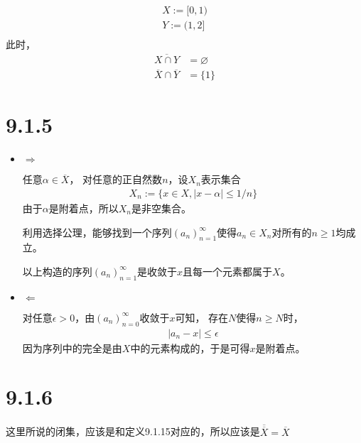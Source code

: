\documentclass{article}
\begin{document}
\begin{align*}
      X := [0, 1) \\
      Y := (1, 2] \\
\end{align*}
此时，
\begin{align*}
      \overline{X \cap Y}            & = \varnothing \\
      \overline{X} \cap \overline{Y} & = \{1\}
\end{align*}

\section*{9.1.5}

\begin{itemize}
      \item $\Rightarrow$

            任意$\alpha \in \overline{X}$，
            对任意的正自然数$n$，设$X_n$表示集合
            \begin{align*}
                  X_n := \{ x \in X, |x - \alpha| \leq 1/n \}
            \end{align*}
            由于$\alpha$是附着点，所以$X_n$是非空集合。

            利用选择公理，能够找到一个序列$(a_n)_{n=1}^\infty$使得$a_n \in X_n$对所有的$n \geq 1$均成立。

            以上构造的序列$(a_n)_{n=1}^\infty$是收敛于$x$且每一个元素都属于$X$。

      \item $\Leftarrow$

            对任意$\epsilon > 0$，由$(a_n)_{n=0}^\infty$收敛于$x$可知，
            存在$N$使得$n \geq N$时，
            \begin{align*}
                  |a_n - x| \leq \epsilon
            \end{align*}
            因为序列中的完全是由$X$中的元素构成的，于是可得$x$是附着点。
\end{itemize}

\section*{9.1.6}

\begin{zremark}
      这里所说的闭集，应该是和定义9.1.15对应的，所以应该是$\overline{\overline{X}} = \overline{X}$
\end{zremark}
\end{document}
